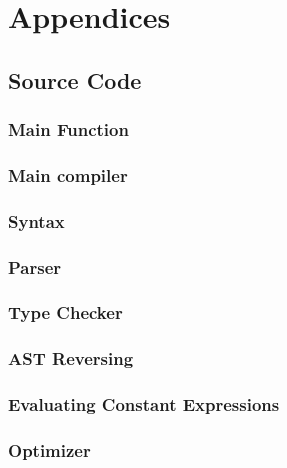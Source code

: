 \section{Appendices} \label{sec:appendices}
\subsection{Source Code}
\subsubsection{Main Function}


\subsubsection{Main compiler}


\subsubsection{Syntax}


\subsubsection{Parser}


\subsubsection{Type Checker}


\subsubsection{AST Reversing}


\subsubsection{Evaluating Constant Expressions}


\subsubsection{Optimizer}


